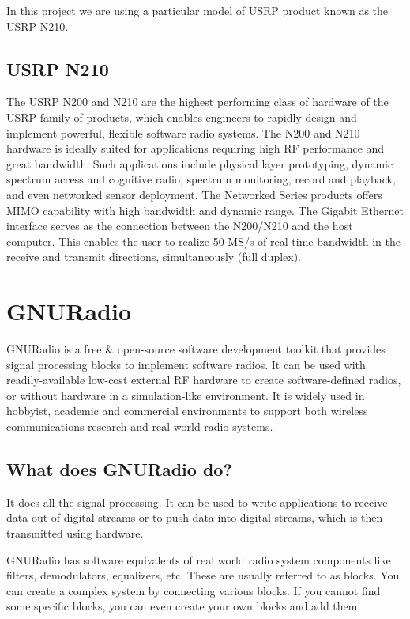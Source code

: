In this project we are using a particular model of USRP product known as the
USRP N210.

\subsection{USRP N210}

The USRP N200 and N210 are the highest performing class of hardware of the 
USRP family of products, which enables engineers to rapidly design and 
implement powerful, flexible software radio systems. The N200 and N210 
hardware is ideally suited for applications requiring high RF performance and
great bandwidth. Such applications include physical layer prototyping, dynamic
spectrum access and cognitive radio, spectrum monitoring, record and playback,
and even networked sensor deployment. The Networked Series products offers 
MIMO capability with high bandwidth and dynamic range. The Gigabit Ethernet
interface serves as the connection between the N200/N210 and the host 
computer. This enables the user to realize 50 MS/s of real-time bandwidth in 
the receive and transmit directions, simultaneously (full duplex).


\section{GNURadio}

GNURadio is a free \& open-source software development toolkit that provides 
signal processing blocks to implement software radios. It can be used with 
readily-available low-cost external RF hardware to create software-defined 
radios, or without hardware in a simulation-like environment. It is widely 
used in hobbyist, academic and commercial environments to support both 
wireless communications research and real-world radio systems.

\subsection{What does GNURadio do?}
It does all the signal processing. It can be used to write applications to 
receive data out of digital streams or to push data into digital streams, 
which is then transmitted using hardware.

GNURadio has software equivalents of real world radio system components like 
filters, demodulators, equalizers, etc. These are usually referred to as
blocks. You can create a complex system by connecting various blocks. If you
cannot find some specific blocks, you can even create your own blocks and add
them.

